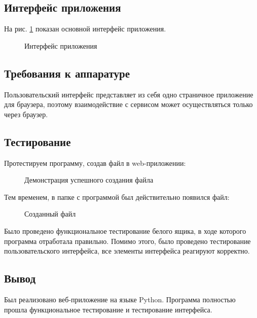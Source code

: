 \subsection*{Интерфейс приложения}%

На рис. \ref{fig:image3} показан основной интерфейс приложения.

\begin{figure}[h!]
	\caption{Интерфейс приложения}
	\label{fig:image3}
\end{figure}

\subsection*{Требования к аппаратуре}%

Пользовательский интерфейс представляет из себя одно страничное
приложение для браузера, поэтому взаимодействие с сервисом может осуществляться только через браузер.

\subsection*{Тестирование}%

Протестируем программу, создав файл в web-приложении:
\begin{figure}[h!]
	\caption{Демонстрация успешного создания файла}
	\label{fig:image5}
\end{figure}
\newline Тем временем, в папке с программой был действительно появился файл:
\begin{figure}[h!]
	\caption{Созданный файл}
	\label{fig:image4}
\end{figure}

Было проведено функциональное тестирование белого ящика, в ходе
которого программа отработала правильно. Помимо этого, было проведено тестирование пользовательского интерфейса, все элементы интерфейса реагируют корректно.
\subsection*{Вывод}%
Был реализовано веб-приложение на языке Python. Программа полностью
прошла функциональное тестирование и тестирование интерфейса.
\newpage
